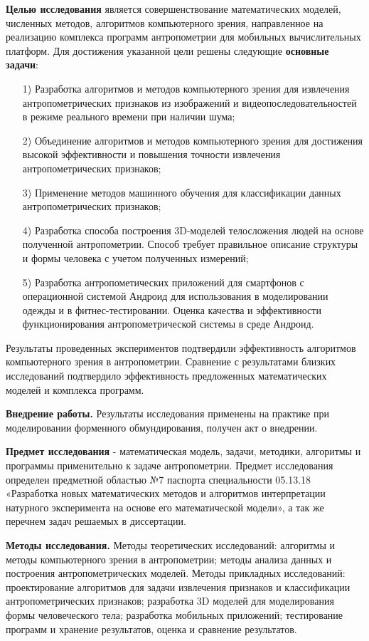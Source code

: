 \textbf{Целью исследования} является совершенствование математических моделей, численных методов, алгоритмов компьютерного зрения, направленное на реализацию комплекса программ антропометрии для мобильных вычислительных платформ. Для достижения указанной цели решены следующие \textbf {основные задачи}:
\begin{enumerate}
	\item[1)] Разработка алгоритмов и методов компьютерного зрения для извлечения антропометрических признаков из изображений и видеопоследовательностей в режиме реального времени при наличии шума;
	\item[2)] Объединение алгоритмов и методов компьютерного зрения для достижения высокой эффективности и повышения точности извлечения антропометрических признаков;
	\item[3)] Применение методов машинного обучения для классификации данных антропометрических признаков;
	\item[4)] Разработка способа построения 3D-моделей телосложения людей на основе полученной антропометрии. Способ требует правильное описание структуры и формы человека с учетом полученных измерений;
	\item[5)] Разработка антропометических приложений для смартфонов с операционной системой Андроид для использования в моделировании одежды и в фитнес-тестировании. Оценка качества и эффективности функционирования антропометрической системы в среде Андроид.
\end{enumerate}
Результаты проведенных экспериментов подтвердили эффективность алгоритмов компьютерного зрения в антропометрии. Сравнение с результатами близких исследований подтвердило эффективность предложенных математических моделей и комплекса программ.

\textbf{Внедрение работы.} Результаты исследования применены на практике при моделировании форменного обмундирования, получен акт о внедрении.

\textbf{Предмет исследования} - математическая модель, задачи, методики, алгоритмы и программы применительно к задаче антропометрии. Предмет исследования определен предметной областью №7 паспорта специальности 05.13.18 «Разработка новых математических методов и алгоритмов интерпретации натурного эксперимента на основе его математической модели», а так же перечнем задач решаемых в диссертации.

\textbf{Методы исследования.} Методы теоретических исследований: алгоритмы и методы компьютерного зрения в антропометрии; методы анализа данных и построения антропометрических моделей. Методы прикладных исследований: проектирование алгоритмов для задачи извлечения признаков и классификации антропометрических признаков; разработка 3D моделей для моделирования формы человеческого тела; разработка мобильных приложений; тестирование программ и хранение результатов, оценка и сравнение результатов.

